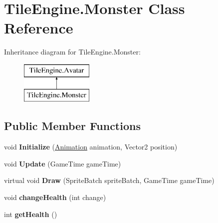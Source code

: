 \hypertarget{class_tile_engine_1_1_monster}{\section{Tile\-Engine.\-Monster Class Reference}
\label{class_tile_engine_1_1_monster}
}
Inheritance diagram for Tile\-Engine.\-Monster\-:\begin{figure}[H]
\begin{center}
\leavevmode
\includegraphics[height=2.000000cm]{class_tile_engine_1_1_monster}
\end{center}
\end{figure}
\subsection*{Public Member Functions}
\begin{DoxyCompactItemize}
\item 
\hypertarget{class_tile_engine_1_1_monster_a3e708e301043038c39cb5a392f2a2a6c}{void {\bfseries Initialize} (\hyperlink{class_tile_engine_1_1_animation}{Animation} animation, Vector2 position)}\label{class_tile_engine_1_1_monster_a3e708e301043038c39cb5a392f2a2a6c}

\item 
\hypertarget{class_tile_engine_1_1_monster_a8fe35134525a9abb6c06bf69348de5c7}{void {\bfseries Update} (Game\-Time game\-Time)}\label{class_tile_engine_1_1_monster_a8fe35134525a9abb6c06bf69348de5c7}

\item 
\hypertarget{class_tile_engine_1_1_monster_a59a438ca1791da6c25a5e849f109c0ed}{virtual void {\bfseries Draw} (Sprite\-Batch sprite\-Batch, Game\-Time game\-Time)}\label{class_tile_engine_1_1_monster_a59a438ca1791da6c25a5e849f109c0ed}

\item 
\hypertarget{class_tile_engine_1_1_monster_aea7a59b9ba54ddb2571733381955274b}{void {\bfseries change\-Health} (int change)}\label{class_tile_engine_1_1_monster_aea7a59b9ba54ddb2571733381955274b}

\item 
\hypertarget{class_tile_engine_1_1_monster_ae68b6e0b8425e7ebc5931316b5d17221}{int {\bfseries get\-Health} ()}\label{class_tile_engine_1_1_monster_ae68b6e0b8425e7ebc5931316b5d17221}

\end{DoxyCompactItemize}

